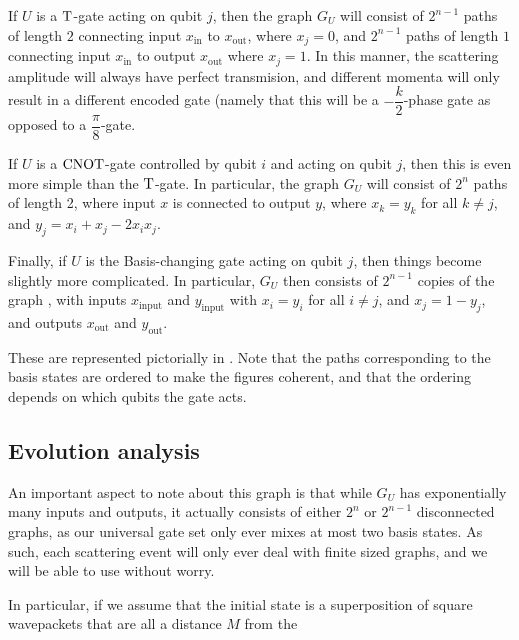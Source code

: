 \documentclass[../thesis-main/thesis-main]{subfiles}
\begin{document}
If $U$ is a $\mathrm{T}$-gate acting on qubit $j$, then the graph $G_U$ will consist of $2^{n-1}$ paths of length $2$ connecting input $x_{\text{in}}$ to $x_{\text{out}}$, where $x_j = 0$, and $2^{n-1}$ paths of length $1$ connecting input $x_{\text{in}}$ to output $x_{\text{out}}$ where $x_{j} = 1$.  In this manner, the scattering amplitude will always have perfect transmision, and different momenta will only result in a different encoded gate (namely that this will be a $-\dfrac{k}{2}$-phase gate as opposed to a $\dfrac{\pi}{8}$-gate.

If $U$ is a $\mathrm{CNOT}$-gate controlled by qubit $i$ and acting on qubit $j$, then this is even more simple than the $\mathrm{T}$-gate.  In particular, the graph $G_U$ will consist of $2^n$ paths of length 2, where input $x$ is connected to output $y$, where $x_k = y_k$ for all $k\neq j$, and $y_j =x_i + x_j - 2 x_i x_j$. 

Finally, if $U$ is the Basis-changing gate acting on qubit $j$, then things become slightly more complicated.  In particular, $G_U$ then consists of $2^{n-1}$ copies of the graph , with inputs $x_{\text{input}}$ and $y_{\text{input}}$ with $x_i = y_i$ for all $i\neq j$, and $x_j = 1-y_j$, and outputs $x_{\text{out}}$ and $y_{\text{out}}$.

These are represented pictorially in .  Note that the paths corresponding to the basis states are ordered to make the figures coherent, and that the ordering depends on which qubits the gate acts.



\subsection{Evolution analysis}

An important aspect to note about this graph is that while $G_U$ has exponentially many inputs and outputs, it actually consists of either $2^n$ or $2^{n-1}$ disconnected graphs, as our universal gate set only ever mixes at most two basis states.  As such, each scattering event will only ever deal with finite sized graphs, and we will be able to use  without worry.

In particular, if we assume that the initial state is a superposition of square wavepackets that are all a distance $M$ from the 


\end{document}
